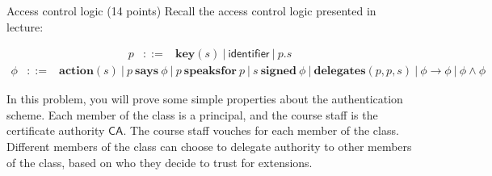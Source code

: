 \documentclass[11pt]{article}
\newcommand{\key}{\ensuremath{\mathbf{key}}\xspace}
\newcommand{\act}{\ensuremath{\mathbf{action}}\xspace}
\newcommand{\signed}{\ensuremath{\mathbf{signed}}\xspace}
\newcommand{\delegates}{\ensuremath{\mathbf{delegates}}\xspace}
\newcommand{\says}{\ensuremath{\mathbf{says}}\xspace}
\newcommand{\speaksfor}{\ensuremath{\mathbf{speaksfor}}\xspace}
\newcommand{\ca}{\ensuremath{\mathsf{CA}}\xspace}
\begin{document}
\begin{problem}{Access control logic (14 points)}
Recall the access control logic presented in lecture:

\[
\begin{array}{lll}
p & ::= & \key(s)\ |\ \mathsf{identifier}\ |\ p.s
\end{array}
\]
\[
\begin{array}{lrl}
\phi & ::= & \act(s)\ |\ p\ \says\ \phi\ |\ p\ \speaksfor\ p\ |\ s\ \signed\ \phi\ |\ \delegates(p,p,s)\ |\ \phi \rightarrow \phi\ |\ \phi \land \phi
\end{array}
\]


In this problem, you will prove some simple properties about the authentication scheme. Each member of the class is a principal, and the course staff is the certificate authority \ca. The course staff vouches for each member of the class. Different members of the class can choose to delegate authority to other members of the class, based on who they decide to trust for extensions.


\end{problem}
\end{document}
